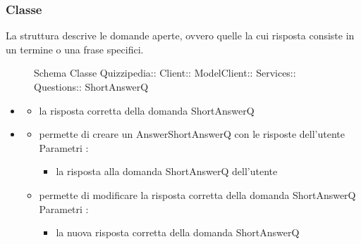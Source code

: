 \subsubsection{Classe }
La struttura descrive le domande aperte, ovvero quelle la cui risposta consiste in un termine o una frase specifici.
\begin{figure}[H]
\centering
\noindent{}
\caption[Schema Classe ShortAnswerQ]{Schema Classe Quizzipedia:: Client:: ModelClient:: Services:: Questions:: ShortAnswerQ}
\end{figure}
\begin{itemize}
\item {}
\begin{itemize}
\item {}
\newline
la risposta corretta della domanda ShortAnswerQ
\end{itemize}
\item {}
\begin{itemize}
\item {}
\newline
permette di creare un AnswerShortAnswerQ con le risposte dell'utente
\newline
Parametri :
\begin{itemize}
\item {}
\newline
la risposta alla domanda ShortAnswerQ dell'utente
\end{itemize}
\item {}
\newline
permette di modificare la risposta corretta della domanda ShortAnswerQ
\newline
Parametri :
\begin{itemize}
\item {}
\newline
la nuova risposta corretta della domanda ShortAnswerQ
\end{itemize}
\end{itemize}
\end{itemize}

